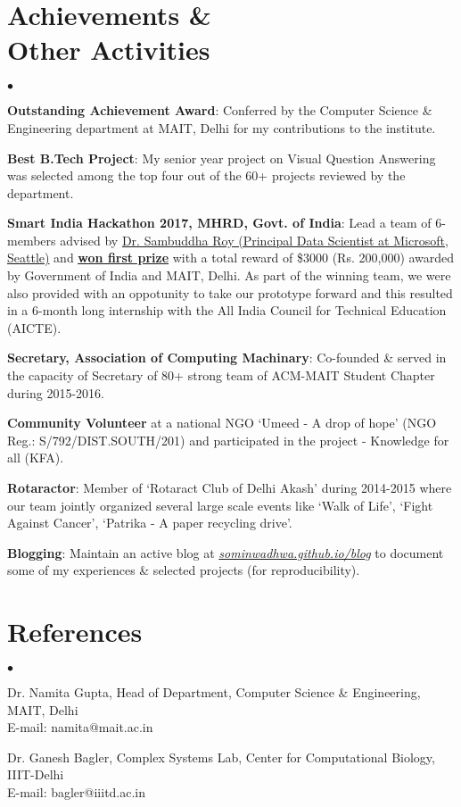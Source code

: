 \documentclass[margin,line]{res}
\newenvironment{list2}{
  \begin{list}{$\bullet$}{%
      \setlength{\itemsep}{0in}
      \setlength{\parsep}{0in} \setlength{\parskip}{0in}
      \setlength{\topsep}{0in} \setlength{\partopsep}{0in}
      \setlength{\leftmargin}{0.2in}}}{\end{list}}
\begin{document}
\begin{resume}
\section{\sc Achievements \& \\ Other Activities}
\begin{list2}
\item {\bf Outstanding Achievement Award}: Conferred by the Computer Science \& Engineering department at MAIT, Delhi for my contributions to the institute.
\item {\bf Best B.Tech Project}: My senior year project on Visual Question Answering was selected among the top four out of the 60+ projects reviewed by the department.
\item {\bf Smart India Hackathon 2017, MHRD, Govt. of India}: Lead a team of 6-members advised by {\href{https://www.linkedin.com/in/sambuddharoy/}{Dr. Sambuddha Roy (Principal Data Scientist at Microsoft, Seattle)}} and {\href{https://www.linkedin.com/feed/update/urn:li:activity:6255398180318470144}{\bf {\underline{won first prize}}}} with a total reward of \$3000 (Rs. 200,000) awarded by Government of India and MAIT, Delhi. As part of the winning team, we were also provided with an oppotunity to take our prototype forward and this resulted in a 6-month long internship with the All India Council for Technical Education (AICTE).
\item {\bf Secretary, Association of Computing Machinary}: Co-founded \& served in the capacity of Secretary of 80+ strong team of ACM-MAIT Student Chapter during 2015-2016.
\item {\bf Community Volunteer} at a national NGO `Umeed - A drop of hope' (NGO Reg.: S/792/DIST.SOUTH/201) and participated in the project - Knowledge for all (KFA).
\item {\bf Rotaractor}: Member of `Rotaract Club of Delhi Akash' during 2014-2015 where our team jointly organized several large scale events like `Walk of Life', `Fight Against Cancer', `Patrika - A paper recycling drive'. 
\item {\bf Blogging}: Maintain an active blog at \textit{{\href{https://sominwadhwa.github.io/blog/}{sominwadhwa.github.io/blog}}} to document some of my experiences \& selected projects (for reproducibility).
\end{list2}

\section{\sc References}
\begin{list2}
\item Dr. Namita Gupta, Head of Department, Computer Science \& Engineering, MAIT, Delhi\\ E-mail: namita@mait.ac.in
\item Dr. Ganesh Bagler, Complex Systems Lab, Center for Computational Biology, IIIT-Delhi\\ E-mail: bagler@iiitd.ac.in
\end{list2}

\end{resume}
\end{document}

